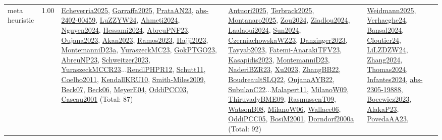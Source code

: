 {\begin{longtable}{p{3cm}r>{\raggedright\arraybackslash}p{6cm}>{\raggedright\arraybackslash}p{6cm}>{\raggedright\arraybackslash}p{8cm}}
\index{meta heuristic}\index{Algorithms!meta heuristic}meta heuristic &  1.00 & \hyperref[detail:Echeverria2025]{Echeverria2025}, \hyperref[detail:Garraffa2025]{Garraffa2025}, \hyperref[detail:PrataAN23]{PrataAN23}, \hyperref[detail:abs-2402-00459]{abs-2402-00459}, \hyperref[detail:LuZZYW24]{LuZZYW24}, \hyperref[detail:Ahmeti2024]{Ahmeti2024}, \hyperref[detail:Nguyen2024]{Nguyen2024}, \hyperref[detail:Hessami2024]{Hessami2024}, \hyperref[detail:AbreuPNF23]{AbreuPNF23}, \hyperref[detail:Oujana2023]{Oujana2023}, \hyperref[detail:Akan2023]{Akan2023}, \hyperref[detail:Ramos2023]{Ramos2023}, \hyperref[detail:Hajji2023]{Hajji2023}, \hyperref[detail:MontemanniD23a]{MontemanniD23a}, \hyperref[detail:YuraszeckMC23]{YuraszeckMC23}, \hyperref[detail:GokPTGO23]{GokPTGO23}, \hyperref[detail:AbreuNP23]{AbreuNP23}, \hyperref[detail:Schweitzer2023]{Schweitzer2023}, \hyperref[detail:YuraszeckMCCR23]{YuraszeckMCCR23}...\hyperref[detail:RendlPHPR12]{RendlPHPR12}, \hyperref[detail:Schutt11]{Schutt11}, \hyperref[detail:Coelho2011]{Coelho2011}, \hyperref[detail:KendallKRU10]{KendallKRU10}, \hyperref[detail:Smith-Miles2009]{Smith-Miles2009}, \hyperref[detail:Beck07]{Beck07}, \hyperref[detail:Beck06]{Beck06}, \hyperref[detail:MeyerE04]{MeyerE04}, \hyperref[detail:OddiPCC03]{OddiPCC03}, \hyperref[detail:Caseau2001]{Caseau2001} (Total: 87) & \hyperref[detail:Antuori2025]{Antuori2025}, \hyperref[detail:Terbrack2025]{Terbrack2025}, \hyperref[detail:Montanaro2025]{Montanaro2025}, \hyperref[detail:Zou2024]{Zou2024}, \hyperref[detail:Ziadlou2024]{Ziadlou2024}, \hyperref[detail:Laalaoui2024]{Laalaoui2024}, \hyperref[detail:Sun2024]{Sun2024}, \hyperref[detail:CzerniachowskaWZ23]{CzerniachowskaWZ23}, \hyperref[detail:Danzinger2023]{Danzinger2023}, \hyperref[detail:Tayyab2023]{Tayyab2023}, \hyperref[detail:Fatemi-AnarakiTFV23]{Fatemi-AnarakiTFV23}, \hyperref[detail:Kasapidis2023]{Kasapidis2023}, \hyperref[detail:MontemanniD23]{MontemanniD23}, \hyperref[detail:NaderiBZR23]{NaderiBZR23}, \hyperref[detail:Xu2023]{Xu2023}, \hyperref[detail:ZhangBB22]{ZhangBB22}, \hyperref[detail:BoudreaultSLQ22]{BoudreaultSLQ22}, \hyperref[detail:OujanaAYB22]{OujanaAYB22}, \hyperref[detail:SubulanC22]{SubulanC22}...\hyperref[detail:Malapert11]{Malapert11}, \hyperref[detail:MilanoW09]{MilanoW09}, \hyperref[detail:ThiruvadyBME09]{ThiruvadyBME09}, \hyperref[detail:RasmussenT09]{RasmussenT09}, \hyperref[detail:WatsonB08]{WatsonB08}, \hyperref[detail:MilanoW06]{MilanoW06}, \hyperref[detail:Wallace06]{Wallace06}, \hyperref[detail:OddiPCC05]{OddiPCC05}, \hyperref[detail:BosiM2001]{BosiM2001}, \hyperref[detail:Dorndorf2000a]{Dorndorf2000a} (Total: 92) & \hyperref[detail:Weidmann2025]{Weidmann2025}, \hyperref[detail:Verhaeghe24]{Verhaeghe24}, \hyperref[detail:Bansal2024]{Bansal2024}, \hyperref[detail:Cloutier24]{Cloutier24}, \hyperref[detail:LiLZDZW24]{LiLZDZW24}, \hyperref[detail:Zhang2024]{Zhang2024}, \hyperref[detail:Thomas2024]{Thomas2024}, \hyperref[detail:Infantes2024]{Infantes2024}, \hyperref[detail:abs-2305-19888]{abs-2305-19888}, \hyperref[detail:Bocewicz2023]{Bocewicz2023}, \hyperref[detail:AlakaP23]{AlakaP23}, \hyperref[detail:PovedaAA23]{PovedaAA23}, 
\end{longtable}}
